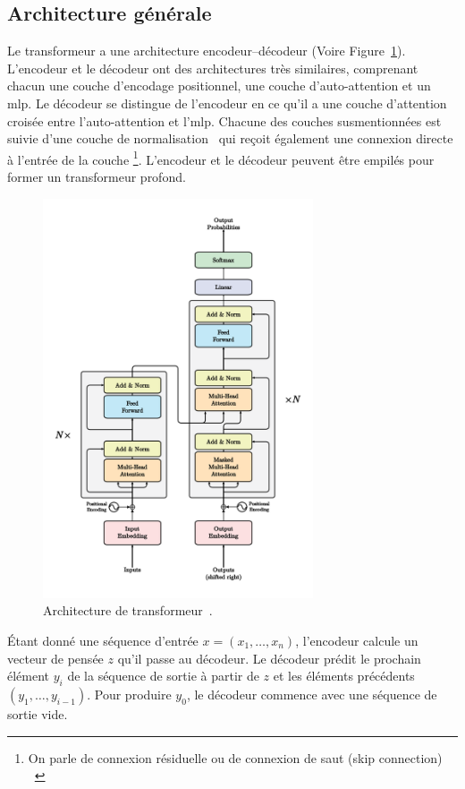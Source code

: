 \subsection{Architecture générale}

Le transformeur a une architecture encodeur--décodeur (Voire Figure~\ref{fig.transformer}).
L'encodeur et le décodeur ont des architectures très similaires, 
comprenant chacun une couche d'encodage positionnel, une couche d'auto-attention et un \gls{mlp}.
Le décodeur se distingue de l'encodeur 
en ce qu'il a une couche d'attention croisée entre l'auto-attention et l'\gls{mlp}.
Chacune des couches susmentionnées est suivie d'une couche de normalisation~\cite{Ba_Kiros_Hinton_2016}
qui reçoit également une connexion directe à l'entrée de la couche%
\footnote{%
    On parle de connexion résiduelle ou de connexion de saut \foreignlanguage{english}{(skip connection)}%
    ~\cite{He_Zhang_Ren_Sun_2016}
}.
L'encodeur et le décodeur peuvent être empilés pour former un transformeur profond.

\begin{figure}[htb]
    \centering
    \includegraphics[width=8cm]{assets/images/transformer.png}
    \caption[L'architecture de transformeur.]
    {Architecture de transformeur~\cite[Fig 1]{attention}.}
    \label{fig.transformer}
\end{figure}

Étant donné une séquence d'entrée \(x = (x_1, \ldots, x_n)\),
l'encodeur calcule un vecteur de pensée \(z\) qu'il passe au décodeur.
Le décodeur prédit le prochain élément \(y_i\) de la séquence de sortie 
à partir de \(z\) et les éléments précédents \((y_1, \ldots, y_{i-1})\).
Pour produire \(y_0\), le décodeur commence avec une séquence de sortie vide.
